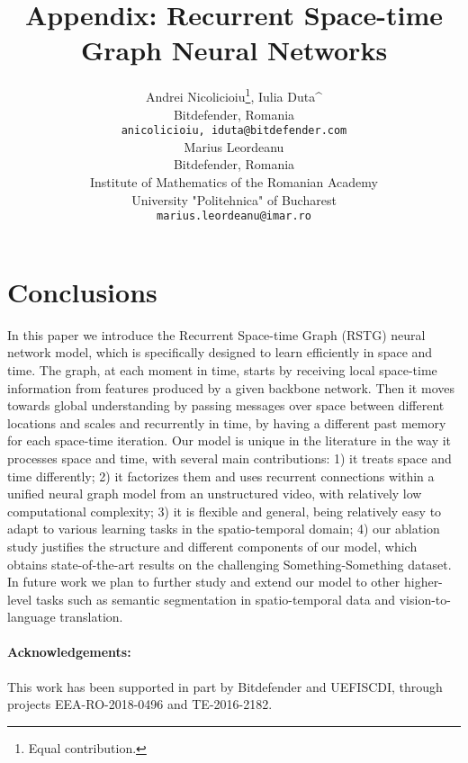 \documentclass{article}
\begin{document}
    
\section{Conclusions}
In this paper we introduce the Recurrent Space-time Graph (RSTG) neural network model, which is specifically designed to learn efficiently in space and time. The graph, at each moment in time, starts by receiving local space-time information from features produced by a given backbone network. Then it moves towards global understanding by passing messages over space between different locations and scales and recurrently in time, by having a different past memory for each space-time iteration. Our model is unique in the literature in the way it processes space and time, with several main contributions: 1) it treats space and time differently; 2) it factorizes them and uses recurrent connections within a unified neural graph model from an unstructured video, with relatively low computational complexity; 3) it is flexible and general, being relatively easy to adapt to various learning tasks in the spatio-temporal domain; 4) our ablation study justifies the structure and different components of our model, which obtains state-of-the-art results on the challenging Something-Something dataset. In future work we plan to further study and extend our model to other higher-level tasks such as semantic segmentation in spatio-temporal data and vision-to-language translation.


\paragraph{Acknowledgements:} This work has been supported in part by Bitdefender and UEFISCDI, through projects EEA-RO-2018-0496 and TE-2016-2182.




\newpage

\appendix

\title{Appendix: Recurrent Space-time Graph Neural Networks}



\author{Andrei Nicolicioiu\thanks{Equal contribution.}, Iulia Duta^\notice{*}\\
  Bitdefender, Romania\\
  \texttt{{anicolicioiu, iduta}@bitdefender.com} \\
  \And
  Marius Leordeanu \\
  Bitdefender, Romania \\
\fontsize{6pt}{7pt}Institute of Mathematics of the Romanian Academy \\
  University "Politehnica" of Bucharest \\
  \texttt{marius.leordeanu@imar.ro} \\
}
\end{document}
